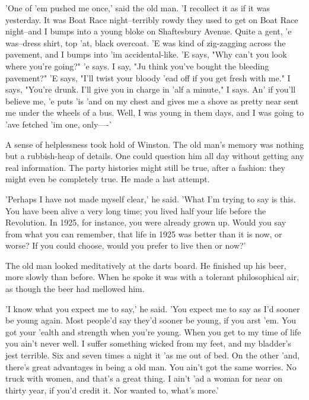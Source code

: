 \documentclass{article}
\begin{document}
'One of 'em pushed me once,' said the old man. 'I recollect it as if it
was yesterday. It was Boat Race night--terribly rowdy they used to get on
Boat Race night--and I bumps into a young bloke on Shaftesbury Avenue.
Quite a gent, 'e was--dress shirt, top 'at, black overcoat. 'E was kind
of zig-zagging across the pavement, and I bumps into 'im accidental-like.
'E says, "Why can't you look where you're going?" 'e says. I say, "Ju think
you've bought the bleeding pavement?" 'E says, "I'll twist your bloody 'ead
off if you get fresh with me." I says, "You're drunk. I'll give you in
charge in 'alf a minute," I says. An' if you'll believe me, 'e puts 'is
'and on my chest and gives me a shove as pretty near sent me under the
wheels of a bus. Well, I was young in them days, and I was going to 'ave
fetched 'im one, only----'

A sense of helplessness took hold of Winston. The old man's memory was
nothing but a rubbish-heap of details. One could question him all day
without getting any real information. The party histories might still be
true, after a fashion: they might even be completely true. He made a last
attempt.

'Perhaps I have not made myself clear,' he said. 'What I'm trying to say
is this. You have been alive a very long time; you lived half your life
before the Revolution. In 1925, for instance, you were already grown up.
Would you say from what you can remember, that life in 1925 was better
than it is now, or worse? If you could choose, would you prefer to live
then or now?'

The old man looked meditatively at the darts board. He finished up his
beer, more slowly than before. When he spoke it was with a tolerant
philosophical air, as though the beer had mellowed him.

'I know what you expect me to say,' he said. 'You expect me to say as I'd
sooner be young again. Most people'd say they'd sooner be young, if you
arst 'em. You got your 'ealth and strength when you're young. When you
get to my time of life you ain't never well. I suffer something wicked
from my feet, and my bladder's jest terrible. Six and seven times a night
it 'as me out of bed. On the other 'and, there's great advantages in being
a old man. You ain't got the same worries. No truck with women, and that's
a great thing. I ain't 'ad a woman for near on thirty year, if you'd
credit it. Nor wanted to, what's more.'
\end{document}
